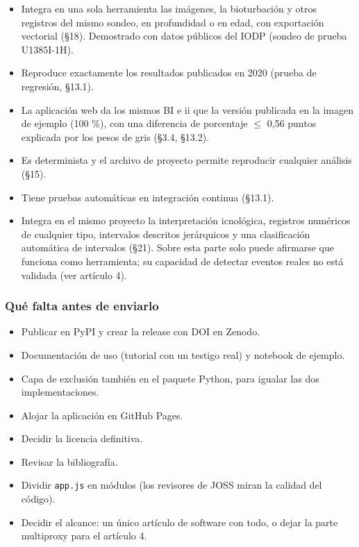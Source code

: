 \documentclass[
  10pt,
]{article}
\providecommand{\tightlist}{%
  \setlength{\itemsep}{0pt}\setlength{\parskip}{0pt}}
\begin{document}
\begin{itemize}
\tightlist
\item
  Integra en una sola herramienta las imágenes, la bioturbación y otros
  registros del mismo sondeo, en profundidad o en edad, con exportación
  vectorial (§18). Demostrado con datos públicos del IODP (sondeo de
  prueba U1385I-1H).
\item
  Reproduce exactamente los resultados publicados en 2020 (prueba de
  regresión, §13.1).
\item
  La aplicación web da los mismos BI e ii que la versión publicada en la
  imagen de ejemplo (100 \%), con una diferencia de porcentaje $\leq$ 0,56
  puntos explicada por los pesos de gris (§3.4, §13.2).
\item
  Es determinista y el archivo de proyecto permite reproducir cualquier
  análisis (§15).
\item
  Tiene pruebas automáticas en integración continua (§13.1).
\item
  Integra en el mismo proyecto la interpretación icnológica, registros
  numéricos de cualquier tipo, intervalos descritos jerárquicos y una
  clasificación automática de intervalos (§21). Sobre esta parte solo
  puede afirmarse que funciona como herramienta; su capacidad de
  detectar eventos reales no está validada (ver artículo 4).
\end{itemize}

\hypertarget{quuxe9-falta-antes-de-enviarlo}{%
\subsubsection{Qué falta antes de
enviarlo}\label{quuxe9-falta-antes-de-enviarlo}}

\begin{itemize}
\tightlist
\item[$\square$]
  Publicar en PyPI y crear la release con DOI en Zenodo.
\item[$\square$]
  Documentación de uso (tutorial con un testigo real) y notebook de
  ejemplo.
\item[$\square$]
  Capa de exclusión también en el paquete Python, para igualar las dos
  implementaciones.
\item[$\square$]
  Alojar la aplicación en GitHub Pages.
\item[$\square$]
  Decidir la licencia definitiva.
\item[$\square$]
  Revisar la bibliografía.
\item[$\square$]
  Dividir \texttt{app.js} en módulos (los revisores de JOSS miran la
  calidad del código).
\item[$\square$]
  Decidir el alcance: un único artículo de software con todo, o dejar la
  parte multiproxy para el artículo 4.
\end{itemize}
\end{document}
